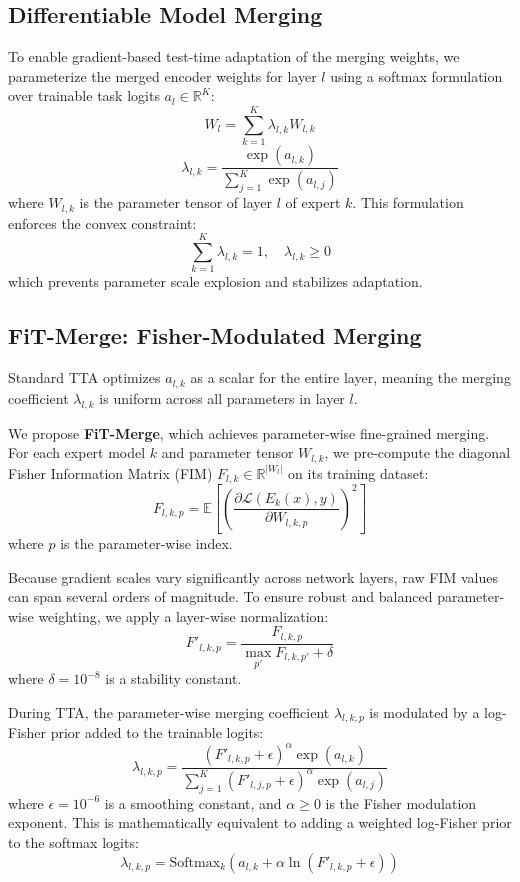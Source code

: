 \documentclass{article}
\theoremstyle{plain}
\theoremstyle{definition}
\theoremstyle{remark}
\begin{document}
\subsection{Differentiable Model Merging}
To enable gradient-based test-time adaptation of the merging weights, we parameterize the merged encoder weights for layer $l$ using a softmax formulation over trainable task logits $a_l \in \mathbb{R}^K$:
$$W_l = \sum_{k=1}^K \lambda_{l,k} W_{l,k}$$
$$\lambda_{l,k} = \frac{\exp(a_{l,k})}{\sum_{j=1}^K \exp(a_{l,j})}$$
where $W_{l,k}$ is the parameter tensor of layer $l$ of expert $k$. This formulation enforces the convex constraint:
$$\sum_{k=1}^K \lambda_{l,k} = 1, \quad \lambda_{l,k} \ge 0$$
which prevents parameter scale explosion and stabilizes adaptation.

\subsection{FiT-Merge: Fisher-Modulated Merging}
Standard TTA optimizes $a_{l,k}$ as a scalar for the entire layer, meaning the merging coefficient $\lambda_{l,k}$ is uniform across all parameters in layer $l$. 

We propose \textbf{FiT-Merge}, which achieves parameter-wise fine-grained merging. For each expert model $k$ and parameter tensor $W_{l,k}$, we pre-compute the diagonal Fisher Information Matrix (FIM) $F_{l,k} \in \mathbb{R}^{|W_l|}$ on its training dataset:
$$F_{l,k,p} = \mathbb{E} \left[ \left( \frac{\partial \mathcal{L}(E_k(x), y)}{\partial W_{l,k,p}} \right)^2 \right]$$
where $p$ is the parameter-wise index.

Because gradient scales vary significantly across network layers, raw FIM values can span several orders of magnitude. To ensure robust and balanced parameter-wise weighting, we apply a layer-wise normalization:
$$F'_{l,k,p} = \frac{F_{l,k,p}}{\max_{p'} F_{l,k,p'} + \delta}$$
where $\delta = 10^{-8}$ is a stability constant.

During TTA, the parameter-wise merging coefficient $\lambda_{l,k,p}$ is modulated by a log-Fisher prior added to the trainable logits:
$$\lambda_{l,k,p} = \frac{(F'_{l,k,p} + \epsilon)^\alpha \exp(a_{l,k})}{\sum_{j=1}^K (F'_{l,j,p} + \epsilon)^\alpha \exp(a_{l,j})}$$
where $\epsilon = 10^{-6}$ is a smoothing constant, and $\alpha \ge 0$ is the Fisher modulation exponent. This is mathematically equivalent to adding a weighted log-Fisher prior to the softmax logits:
$$\lambda_{l,k,p} = \text{Softmax}_k \left( a_{l,k} + \alpha \ln(F'_{l,k,p} + \epsilon) \right)$$
\end{document}
